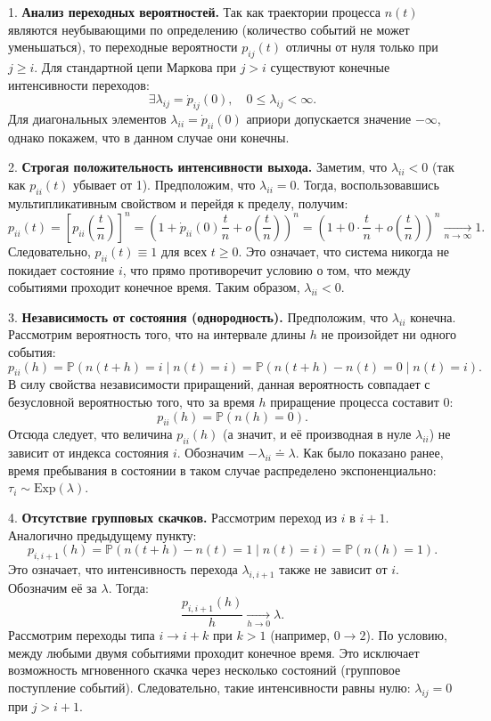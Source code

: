 \begin{sproof}
1. \textbf{Анализ переходных вероятностей.} 
Так как траектории процесса $n(t)$ являются неубывающими по определению (количество событий не может уменьшаться), то переходные вероятности $p_{ij}(t)$ отличны от нуля только при $j \ge i$. Для стандартной цепи Маркова при $j > i$ существуют конечные интенсивности переходов:
$$ \exists \lambda_{ij} = \dot{p}_{ij}(0), \quad 0 \le \lambda_{ij} < \infty. $$
Для диагональных элементов $\lambda_{ii} = \dot{p}_{ii}(0)$ априори допускается значение $-\infty$, однако покажем, что в данном случае они конечны.

2. \textbf{Строгая положительность интенсивности выхода.}
Заметим, что $\lambda_{ii} < 0$ (так как $p_{ii}(t)$ убывает от 1). Предположим, что $\lambda_{ii} = 0$. Тогда, воспользовавшись мультипликативным свойством и перейдя к пределу, получим:
$$ p_{ii}(t) = \left[ p_{ii}\left(\frac{t}{n}\right) \right]^n = \left( 1 + \dot{p}_{ii}(0) \frac{t}{n} + o\left(\frac{t}{n}\right) \right)^n = \left( 1 + 0 \cdot \frac{t}{n} + o\left(\frac{t}{n}\right) \right)^n \xrightarrow[n \to \infty]{} 1. $$
Следовательно, $p_{ii}(t) \equiv 1$ для всех $t \ge 0$. Это означает, что система никогда не покидает состояние $i$, что прямо противоречит условию о том, что между событиями проходит конечное время. Таким образом, $\lambda_{ii} < 0$.

3. \textbf{Независимость от состояния (однородность).}
Предположим, что $\lambda_{ii}$ конечна. Рассмотрим вероятность того, что на интервале длины $h$ не произойдет ни одного события:
$$ p_{ii}(h) = \mathbb{P}(n(t+h) = i \mid n(t) = i) = \mathbb{P}(n(t+h) - n(t) = 0 \mid n(t) = i). $$
В силу свойства независимости приращений, данная вероятность совпадает с безусловной вероятностью того, что за время $h$ приращение процесса составит $0$:
$$ p_{ii}(h) = \mathbb{P}(n(h) = 0). $$
Отсюда следует, что величина $p_{ii}(h)$ (а значит, и её производная в нуле $\lambda_{ii}$) не зависит от индекса состояния $i$. Обозначим $-\lambda_{ii} \doteq \lambda$. Как было показано ранее, время пребывания в состоянии в таком случае распределено экс­по­нен­ци­аль­но: $\tau_i \sim \text{Exp}(\lambda)$.

4. \textbf{Отсутствие групповых скачков.}
Рассмотрим переход из $i$ в $i+1$. Аналогично предыдущему пункту:
$$ p_{i, i+1}(h) = \mathbb{P}(n(t+h) - n(t) = 1 \mid n(t) = i) = \mathbb{P}(n(h) = 1). $$
Это означает, что интенсивность перехода $\lambda_{i, i+1}$ также не зависит от $i$. Обозначим её за $\lambda$. Тогда:
$$ \frac{p_{i, i+1}(h)}{h} \xrightarrow[h \to 0]{} \lambda. $$
Рассмотрим переходы типа $i \to i+k$ при $k > 1$ (например, $0 \to 2$). По условию, между любыми двумя событиями проходит конечное время. Это исключает возможность мгновенного скачка через несколько состояний (групповое поступление событий). Следовательно, такие интенсивности равны нулю: $\lambda_{ij} = 0$ при $j > i+1$.
\end{sproof}

